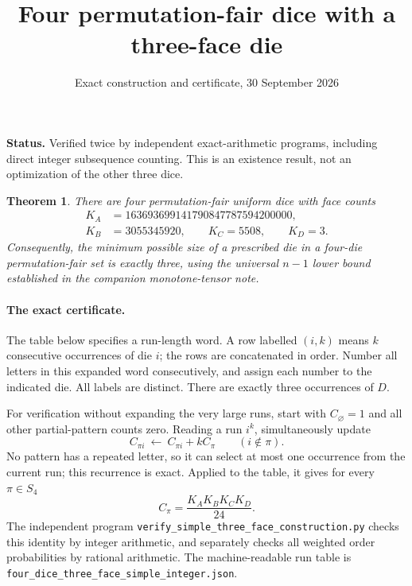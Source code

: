 \documentclass[11pt]{article}
\title{Four permutation-fair dice with a three-face die}
\author{Exact construction and certificate, 30 September 2026}
\date{}
\newtheorem{theorem}{Theorem}
\begin{document}
\maketitle
\noindent\textbf{Status.} Verified twice by independent exact-arithmetic
programs, including direct integer subsequence counting. This is an
existence result, not an optimization of the other three dice.

\begin{theorem}
There are four permutation-fair uniform dice with face counts
\[
 \begin{split}
 K_A&=163693699141790847787594200000,\\
 K_B&=3055345920,\qquad K_C=5508,\qquad K_D=3.
 \end{split}
\]
Consequently, the minimum possible size of a prescribed die in a
four-die permutation-fair set is exactly three, using the universal
$n-1$ lower bound established in the companion monotone-tensor note.
\end{theorem}

\paragraph{The exact certificate.}
The table below specifies a run-length word. A row labelled $(i,k)$ means
$k$ consecutive occurrences of die $i$; the rows are concatenated in order.
Number all letters in this expanded word consecutively, and assign each
number to the indicated die. All labels are distinct. There are exactly
three occurrences of $D$.

For verification without expanding the very large runs, start with
$C_{\varnothing}=1$ and all other partial-pattern counts zero. Reading a
run $i^k$, simultaneously update
\[
 C_{\pi i}\ \leftarrow\ C_{\pi i}+kC_\pi
 \qquad(i\notin\pi).
\]
No pattern has a repeated letter, so it can select at most one occurrence
from the current run; this recurrence is exact. Applied to the table, it
gives for every $\pi\in S_4$
\[
 C_\pi=\frac{K_AK_BK_CK_D}{24}.
\]
The independent program \texttt{verify\_simple\_three\_face\_construction.py}
checks this identity by integer arithmetic, and separately checks all
weighted order probabilities by rational arithmetic. The machine-readable
run table is \texttt{four\_dice\_three\_face\_simple\_integer.json}.
\end{document}
